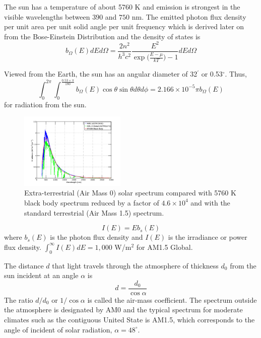 \documentclass[12pt]{article}
\begin{document}
The sun has a temperature of about 5760 K and emission is strongest in the visible wavelengths between $390$ and $750$ nm.  The emitted photon flux density per unit area per unit solid angle per unit frequency which is derived later on from the Bose-Einstein Distribution and the density of states is 
\begin{equation}
b_\Omega(E) dE d\Omega = \frac{2 n^2}{h^3 c^2} \frac{E^2}{\exp{(\frac{E - \mu}{k T}}) -1} dE d\Omega
\end{equation}

Viewed from the Earth, the sun has an angular diameter of 32$^{\prime}$ or 0.53$^{\circ}$.  Thus, 
\begin{equation}
\int_0^{2 \pi} \int^{\frac{0.53 \times \pi}{180}}_0 b_\Omega(E) \cos \theta \sin \theta d\theta d\phi = 2.166 \times 10^{-5} \pi  b_\Omega(E)
\end{equation}
for radiation from the sun.  

\begin{figure}[H]
\centering
\includegraphics[width=0.45\textwidth]{Figures/IrradianceVersusWavelengthWithBlackbody}
 \caption[Solar Spectrum with 5760 K black body]{Extra-terrestrial (Air Mass 0) solar spectrum compared with 5760 K black body spectrum reduced by a factor of $4.6 \times 10^4$ and with the standard terrestrial (Air Mass 1.5) spectrum.}
  \label{fig:SolarSpectrumwBlackBody}
\end{figure}


\begin{equation}
\boxed{I(E) = E b_s(E)}
\end{equation}
where $b_s(E)$ is the photon flux density and $I(E)$ is the irradiance or power flux density.
$\int_0^{\infty} I(E) dE = 1,000$ W/m$^2$ for AM1.5 Global.  

The distance $d$ that light travels through the atmosphere of thickness $d_0$ from the sun incident at an angle $\alpha$ is 
\begin{equation}
\boxed{d = \frac{d_0}{\cos \alpha}}
\end{equation}
The ratio $d/d_0$ or $1/\cos \alpha$ is called the air-mass coefficient.  
The spectrum outside the atmosphere is designated by AM0 and the typical spectrum for moderate climates such as the contiguous United State is AM1.5, which corresponds to the angle of incident of solar radiation, $\alpha = 48^{\circ}$.
\end{document}
